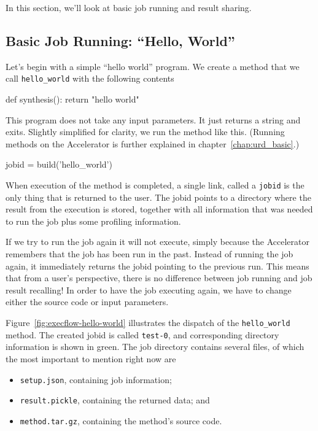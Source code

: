 In this section, we'll look at basic job running and result sharing.



\subsection{Basic Job Running:  ``Hello, World''}

Let's begin with a simple ``hello world'' program.  We create a method
that we call \texttt{hello\_world} with the following contents
\begin{python}
def synthesis():
    return "hello world"
\end{python}
This program does not take any input parameters.  It just returns a
string and exits.  Slightly simplified for clarity, we run the method
like this. (Running methods on the Accelerator is further explained in
chapter~\ref{chap:urd_basic}.)
\begin{python}
jobid = build('hello_world')
\end{python}
When execution of the method is completed, a single link, called a
\texttt{jobid} is the only thing that is returned to the user.  The
jobid points to a directory where the result from the execution is
stored, together with all information that was needed to run the job
plus some profiling information.

If we try to run the job again it will not execute, simply because the
Accelerator remembers that the job has been run in the past.  Instead
of running the job again, it immediately returns the jobid pointing to
the previous run.  This means that from a user's perspective, there is
no difference between job running and job result recalling!  In order
to have the job executing again, we have to change either the source
code or input parameters.

Figure~\ref{fig:execflow-hello-world} illustrates the dispatch of the
\texttt{hello\_world} method.  The created jobid is called
\texttt{test-0}, and corresponding directory information is shown in
green.  The job directory contains several files, of which the most
important to mention right now are
\begin{itemize}
\item[] \texttt{setup.json}, containing job information;
\item[] \texttt{result.pickle}, containing the returned data; and
\item[] \texttt{method.tar.gz}, containing the method's source code.
\end{itemize}

